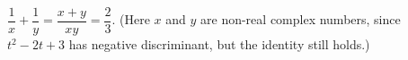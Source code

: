 $\dfrac{1}{x}+\dfrac{1}{y}=\dfrac{x+y}{xy}=\boxed{\dfrac{2}{3}}$. (Here $x$ and $y$ are non-real complex numbers, since $t^2-2t+3$ has negative discriminant, but the identity still holds.)
